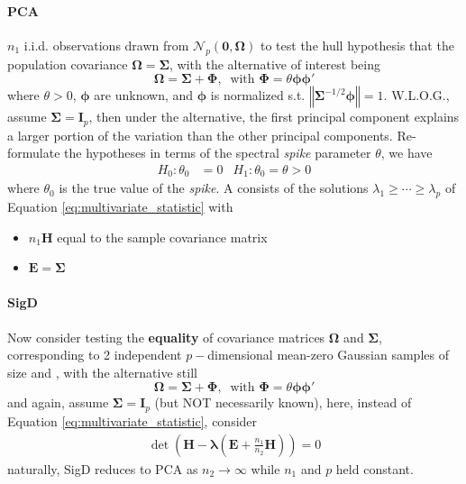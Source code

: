 \documentclass[twoside]{article}
\begin{document}
\paragraph*{PCA} $n_1$ i.i.d. observations drawn from $\mathcal{N}_p(\mathbf{0},\boldsymbol{\Omega})$ to test the hull hypothesis that the population covariance $\boldsymbol{\Omega} = \boldsymbol{\Sigma}$, with the alternative of interest being $$ \boldsymbol{\Omega} = \boldsymbol{\Sigma+\Phi},\ \text{ with }\boldsymbol{\Phi}=\theta \boldsymbol{\phi\phi'}  $$ where $\theta>0$, $\boldsymbol{\phi}$ are unknown, and $\boldsymbol{\phi}$ is normalized s.t. $\left\Vert \boldsymbol{\Sigma}^{-1/2}\boldsymbol{\phi} \right\Vert = 1$. W.L.O.G., assume $\boldsymbol{\Sigma}=\mathbf{I}_p$, then under the alternative, the first principal component explains a larger portion of the variation than the other principal components. Re-formulate the hypotheses in terms of the spectral \textit{spike} parameter $\theta$, we have
\begin{align}\label{eq:spectral_spike_hypotheses}
    H_0: \theta_0 &= 0 & H_1: \theta_0 = \theta>0
\end{align}
where $\theta_0$ is the true value of the \textit{spike}. A  consists of the solutions $\lambda_1\geq \cdots\geq \lambda_p$ of Equation \ref{eq:multivariate_statistic} with
\begin{itemize}
    \item $n_1\mathbf{H}$ equal to the sample covariance matrix
    \item $\mathbf{E} = \boldsymbol{\Sigma}$
\end{itemize}

\paragraph*{SigD} Now consider testing the \textbf{equality} of covariance matrices $\boldsymbol{\Omega}$ and $\boldsymbol{\Sigma}$, corresponding to 2 independent $p-$dimensional mean-zero Gaussian samples of size  and , with the alternative still  $$ \boldsymbol{\Omega} = \boldsymbol{\Sigma+\Phi},\ \text{ with }\boldsymbol{\Phi}=\theta \boldsymbol{\phi\phi'}  $$ and again, assume $\boldsymbol{\Sigma}=\mathbf{I}_p$ (but NOT necessarily known), here, instead of Equation \ref{eq:multivariate_statistic}, consider 
\begin{align}
    \det \left( \mathbf{H}-\boldsymbol{\lambda}\left(\mathbf{E}+\frac{n_1}{n_2}\mathbf{H}\right) \right) = 0
\end{align}
naturally, SigD reduces to PCA as $n_2\rightarrow\infty$ while $n_1$ and $p$ held constant.
\end{document}
